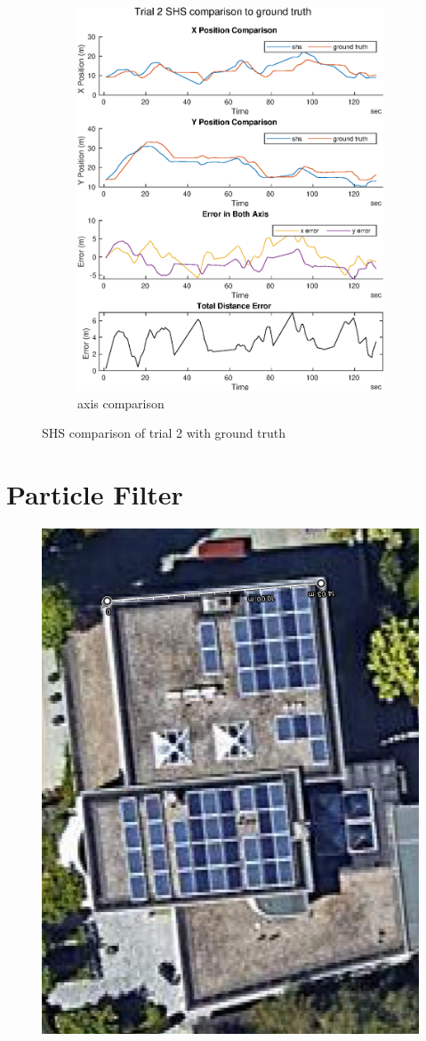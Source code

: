 \begin{figure}[H]
\begin{subfigure}[t]{.45\textwidth}
		\includegraphics[width=\linewidth]{images/20201029_1042_trial2_shs_2}
		\caption{axis comparison}
		\label{fig:trial2_comparison}
	\end{subfigure}
	\caption{SHS comparison of trial 2 with ground truth}
	\label{fig:trial2_shs_gt_comparison}
\end{figure}


\section{Particle Filter}
\begin{figure}[H]
	\centering
	\includegraphics[width=0.4\linewidth]{images/house_google_maps}
	\caption{}
	\label{fig:house_google_maps}
\end{figure}

